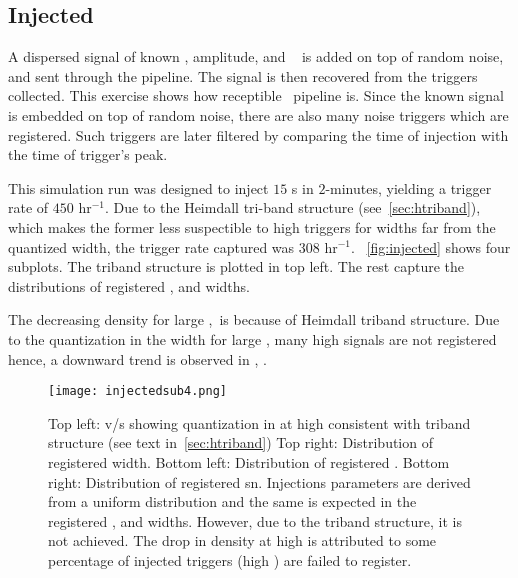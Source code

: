 \subsection{Injected}
\label{ssub:injected}
\par A dispersed signal of known \dm, amplitude, and \wd~ is added on top of random noise, and sent through the pipeline.
The signal is then recovered from the triggers collected.
This exercise shows how receptible \vf~pipeline is.
Since the known signal is embedded on top of random noise, there are also many noise triggers which are registered.
Such triggers are later filtered by comparing the time of injection with the time of trigger's peak.
\par This simulation run was designed to inject $15$ \frb{}s in $2$-minutes, yielding a trigger rate of $450$ hr$^{-1}$.
Due to the Heimdall tri-band structure (see~\autoref{sec:htriband}), which makes the former less suspectible to high \dm triggers for widths far from the quantized width, the trigger rate captured was $308$ hr$^{-1}$.
~\autoref{fig:injected} shows four subplots. The triband structure is plotted in top left. The rest capture the distributions of registered \sn, \dm and widths.
\par The decreasing density for large \sn,\dm~is because of Heimdall triband structure. 
Due to the quantization in the width for large \dm, many high \dm signals are not registered hence, a downward trend is observed in \sn, \dm.

\begin{figure}
	\label{fig:injected}
	\texttt{[image: injectedsub4.png]}
	\caption{Top left: \dm v/s \wd showing quantization in \wd at high \dm consistent with triband structure (see text in~\autoref{sec:htriband})
		Top right: Distribution of registered width.
		Bottom left: Distribution of registered \dm.
		Bottom right: Distribution of registered sn.
		Injections parameters are derived from a uniform distribution and the same is expected in the registered \sn, \dm and widths.
		However, due to the triband structure, it is not achieved. The drop in density at high \sn is attributed to some percentage of injected triggers (high \dm) are failed to register.
	}
\end{figure}
